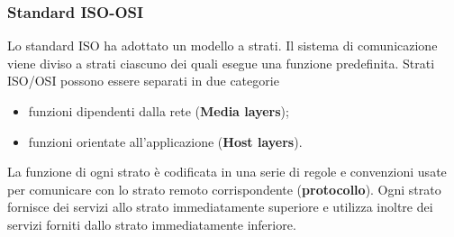 \documentclass{article}
\begin{document}
\subsubsection{Standard ISO-OSI}
Lo standard ISO ha adottato un modello a strati. Il sistema di comunicazione viene diviso a strati ciascuno dei quali esegue una funzione predefinita.
Strati ISO/OSI possono essere separati in due categorie
\begin{itemize}
    \item funzioni dipendenti dalla rete (\textbf{Media layers});
    \item funzioni orientate all'applicazione (\textbf{Host layers}).
\end{itemize}
La funzione di ogni strato è codificata in una serie di regole e convenzioni usate per comunicare con lo strato remoto corrispondente (\textbf{protocollo}). 
Ogni strato fornisce dei servizi allo strato immediatamente superiore e utilizza inoltre dei servizi forniti dallo strato immediatamente inferiore.
\end{document}

